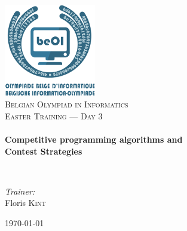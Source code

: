\begin{titlepage}
\begin{center}

\includegraphics[width=0.3\textwidth]{./img/beoi-logo}~\\[1cm]

\textsc{\LARGE Belgian Olympiad in Informatics}\\[1.5cm]

\textsc{\Large Easter Training --- Day 3}\\[0.5cm]

\HRule \\[0.4cm]
{ \huge \bfseries Competitive programming algorithms and \\ Contest Strategies \\[0.4cm] }

\HRule \\[1.5cm]

\begin{center} \large
\emph{Trainer:}\\
Floris \textsc{Kint}
\end{center}

\vfill

{\large \today}

\end{center}
\end{titlepage}
